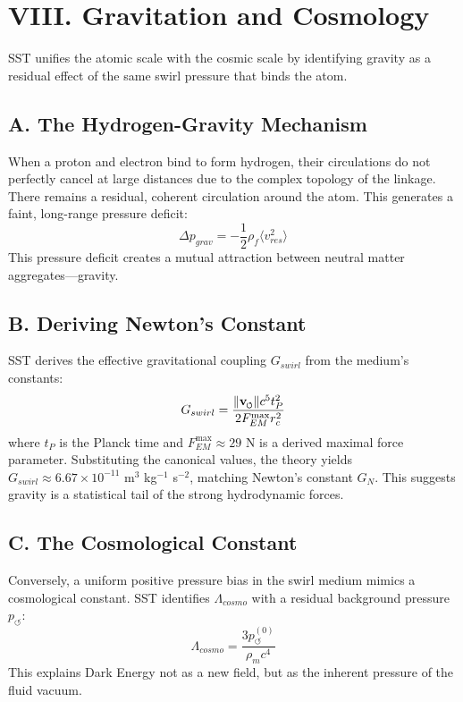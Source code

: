 \documentclass[11pt]{article}
\newcommand{\vswirl}{\mathbf{v}_{\mkern-2mu\scriptscriptstyle\boldsymbol{\circlearrowleft}}}
\begin{document}
\section*{VIII. Gravitation and Cosmology}
SST unifies the atomic scale with the cosmic scale by identifying gravity as a residual effect of the same swirl pressure that binds the atom.

\subsection*{A. The Hydrogen-Gravity Mechanism}
When a proton and electron bind to form hydrogen, their circulations do not perfectly cancel at large distances due to the complex topology of the linkage. There remains a residual, coherent circulation around the atom. This generates a faint, long-range pressure deficit:
\begin{equation}
\Delta p_{grav} = - \frac{1}{2} \rho_f \langle v_{res}^2 \rangle
\end{equation}
This pressure deficit creates a mutual attraction between neutral matter aggregates—gravity.

\subsection*{B. Deriving Newton's Constant}
SST derives the effective gravitational coupling $G_{swirl}$ from the medium's constants:
\begin{equation}
G_{swirl} = \frac{\|\vswirl\| c^5 t_P^2}{2 F_{EM}^{\max} r_c^2}
\end{equation}
where $t_P$ is the Planck time and $F_{EM}^{\max} \approx 29$ N is a derived maximal force parameter. Substituting the canonical values, the theory yields $G_{swirl} \approx 6.67 \times 10^{-11}$ m$^3$ kg$^{-1}$ s$^{-2}$, matching Newton's constant $G_N$. This suggests gravity is a statistical tail of the strong hydrodynamic forces.

\subsection*{C. The Cosmological Constant}
Conversely, a uniform positive pressure bias in the swirl medium mimics a cosmological constant. SST identifies $\Lambda_{cosmo}$ with a residual background pressure $p_\circlearrowleft$:
\begin{equation}
\Lambda_{cosmo} = \frac{3 p_\circlearrowleft^{(0)}}{\rho_m c^4}
\end{equation}
This explains Dark Energy not as a new field, but as the inherent pressure of the fluid vacuum.
\end{document}

